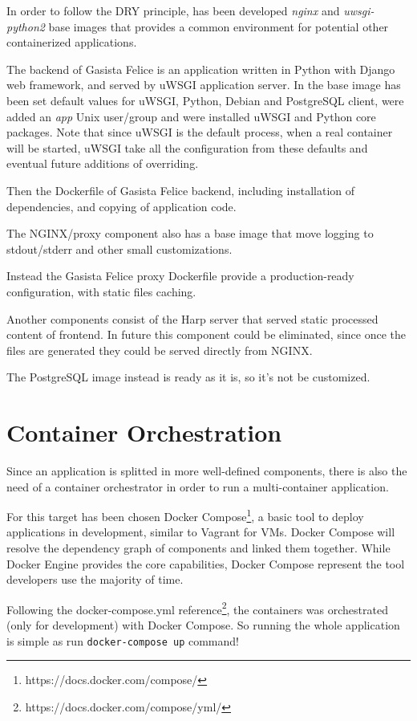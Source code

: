 In order to follow the DRY principle, has been developed \textit{nginx}
and \textit{uwsgi-python2} base images that provides a common
environment for potential other containerized applications.

The backend of Gasista Felice is an application written in Python with
Django web framework, and served by uWSGI application server. In the
base image has been set default values for uWSGI, Python, Debian and
PostgreSQL client, were added an \textit{app} Unix user/group and were
installed uWSGI and Python core packages. Note that since uWSGI is the
default process, when a real container will be started, uWSGI take all
the configuration from these defaults and eventual future additions of
overriding.

Then the Dockerfile of Gasista Felice backend, including installation of
dependencies, and copying of application code.

The NGINX/proxy component also has a base image that move logging to
stdout/stderr and other small customizations.

Instead the Gasista Felice proxy Dockerfile provide a production-ready
configuration, with static files caching.

Another components consist of the Harp server that served static
processed content of frontend. In future this component could be
eliminated, since once the files are generated they could be served
directly from NGINX.

The PostgreSQL image instead is ready as it is, so it's not be
customized.

\section{Container Orchestration}\label{container-orchestration}

Since an application is splitted in more well-defined components, there is also the need of a container orchestrator in order to run a multi-container application.

For this target has been chosen Docker Compose\footnote{https://docs.docker.com/compose/}, a basic tool to deploy applications in development, similar to Vagrant for VMs. Docker Compose will resolve the dependency graph of components and linked them together. While Docker Engine provides the core capabilities, Docker Compose represent the tool developers use the majority of time.

Following the docker-compose.yml reference\footnote{https://docs.docker.com/compose/yml/}, the containers was orchestrated (only for development) with Docker Compose. So running the whole application is simple as run \texttt{docker-compose up} command!

